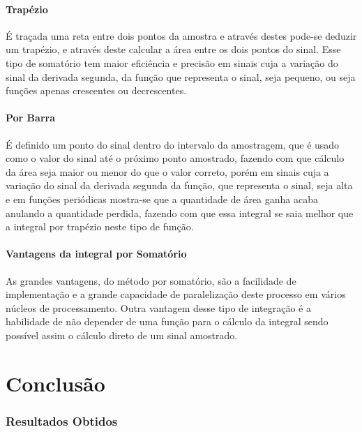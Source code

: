 \documentclass[12pt,a4paper]{report}
\begin{document}
\subsubsection{Trapézio}
É traçada uma reta entre dois pontos da amostra e através destes pode-se deduzir um trapézio, e através deste calcular a área entre os dois pontos do sinal. Esse tipo de somatório tem maior eficiência e precisão em sinais cuja a variação do sinal da derivada segunda, da função que representa o sinal, seja pequeno, ou seja funções apenas crescentes ou decrescentes.



\subsubsection{Por Barra}
É definido um ponto do sinal dentro do intervalo da amostragem, que é usado como o valor do sinal até o próximo ponto amostrado, fazendo com que cálculo da área seja maior ou menor do que o valor correto, porém em sinais cuja a variação do sinal da derivada segunda da função, que representa o sinal, seja alta e em funções periódicas mostra-se que a quantidade de área ganha acaba anulando a quantidade perdida, fazendo com que essa integral se saia melhor que a integral por trapézio neste tipo de função.



\subsubsection{Vantagens da integral por Somatório}
As grandes vantagens, do método por somatório, são a facilidade de implementação e a grande capacidade de paralelização deste processo em vários núcleos de processamento. Outra vantagem desse tipo de integração é a habilidade de não depender de uma função para o cálculo da integral sendo possível assim o cálculo direto de um sinal amostrado.

\chapter{Conclusão}

\subsection{Resultados Obtidos}
\end{document}
